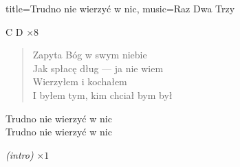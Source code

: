\begin{song}{title={Trudno nie wierzyć w nic}, music={Raz Dwa Trzy}}
\begin{chorus}
    \end{chorus}
    \begin{solo}
        C D $\times 8$
    \end{solo}
    \begin{verse}
        Zapyta Bóg w swym niebie \\
        Jak spłacę dług --- ja nie wiem \\
        Wierzyłem i kochałem \\
        I byłem tym, kim chciał bym był
    \end{verse}
    \begin{chorus}
        Trudno nie wierzyć w nic \\
        Trudno nie wierzyć w nic
    \end{chorus}
    \begin{outro}
        \textit{(intro)} $\times 1$
    \end{outro}
\end{song}

